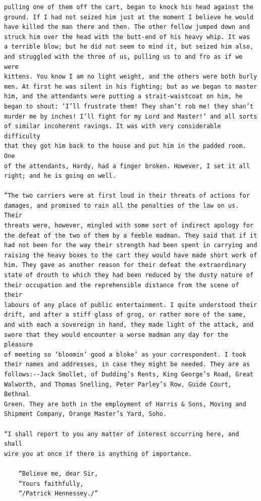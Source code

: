 \documentclass{article}
\begin{document}
\begin{verbatim}
pulling one of them off the cart, began to knock his head against the
ground. If I had not seized him just at the moment I believe he would
have killed the man there and then. The other fellow jumped down and
struck him over the head with the butt-end of his heavy whip. It was
a terrible blow; but he did not seem to mind it, but seized him also,
and struggled with the three of us, pulling us to and fro as if we were
kittens. You know I am no light weight, and the others were both burly
men. At first he was silent in his fighting; but as we began to master
him, and the attendants were putting a strait-waistcoat on him, he
began to shout: ‘I’ll frustrate them! They shan’t rob me! they shan’t
murder me by inches! I’ll fight for my Lord and Master!’ and all sorts
of similar incoherent ravings. It was with very considerable difficulty
that they got him back to the house and put him in the padded room. One
of the attendants, Hardy, had a finger broken. However, I set it all
right; and he is going on well.

“The two carriers were at first loud in their threats of actions for
damages, and promised to rain all the penalties of the law on us. Their
threats were, however, mingled with some sort of indirect apology for
the defeat of the two of them by a feeble madman. They said that if it
had not been for the way their strength had been spent in carrying and
raising the heavy boxes to the cart they would have made short work of
him. They gave as another reason for their defeat the extraordinary
state of drouth to which they had been reduced by the dusty nature of
their occupation and the reprehensible distance from the scene of their
labours of any place of public entertainment. I quite understood their
drift, and after a stiff glass of grog, or rather more of the same,
and with each a sovereign in hand, they made light of the attack, and
swore that they would encounter a worse madman any day for the pleasure
of meeting so ‘bloomin’ good a bloke’ as your correspondent. I took
their names and addresses, in case they might be needed. They are as
follows:--Jack Smollet, of Dudding’s Rents, King George’s Road, Great
Walworth, and Thomas Snelling, Peter Parley’s Row, Guide Court, Bethnal
Green. They are both in the employment of Harris & Sons, Moving and
Shipment Company, Orange Master’s Yard, Soho.

“I shall report to you any matter of interest occurring here, and shall
wire you at once if there is anything of importance.

    “Believe me, dear Sir,
    “Yours faithfully,
    “/Patrick Hennessey./”



\end{verbatim}
\end{document}
